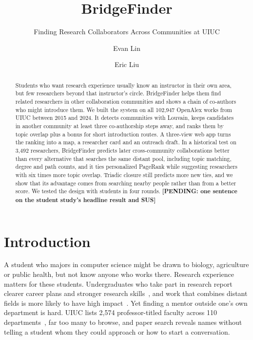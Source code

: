 \documentclass[sigconf,nonacm]{acmart}
\newcommand{\pending}[1]{\textcolor{red!70!black}{\textbf{[PENDING: #1]}}}
\begin{document}
\title{BridgeFinder}
\subtitle{Finding Research Collaborators Across Communities at UIUC}

\author{Evan Lin}
\author{Eric Liu}

\begin{abstract}
Students who want research experience usually know an instructor in their own area, but few researchers beyond that instructor's circle. BridgeFinder helps them find related researchers in other collaboration communities and shows a chain of co-authors who might introduce them. We built the system on all 102,947 OpenAlex works from UIUC between 2015 and 2024. It detects communities with Louvain, keeps candidates in another community at least three co-authorship steps away, and ranks them by topic overlap plus a bonus for short introduction routes. A three-view web app turns the ranking into a map, a researcher card and an outreach draft. In a historical test on 3,492 researchers, BridgeFinder predicts later cross-community collaborations better than every alternative that searches the same distant pool, including topic matching, degree and path counts, and it ties personalized PageRank while suggesting researchers with six times more topic overlap. Triadic closure still predicts more new ties, and we show that its advantage comes from searching nearby people rather than from a better score. We tested the design with students in four rounds. \pending{one sentence on the student study's headline result and SUS}
\end{abstract}


\maketitle

\section{Introduction}
A student who majors in computer science might be drawn to biology, agriculture or public health, but not know anyone who works there. Research experience matters for these students. Undergraduates who take part in research report clearer career plans and stronger research skills~\cite{lopatto2007,hunter2007}, and work that combines distant fields is more likely to have high impact~\cite{uzzi2013}. Yet finding a mentor outside one's own department is hard. UIUC lists 2,574 professor-titled faculty across 110 departments~\cite{graybook}, far too many to browse, and paper search reveals names without telling a student whom they could approach or how to start a conversation.
\end{document}
